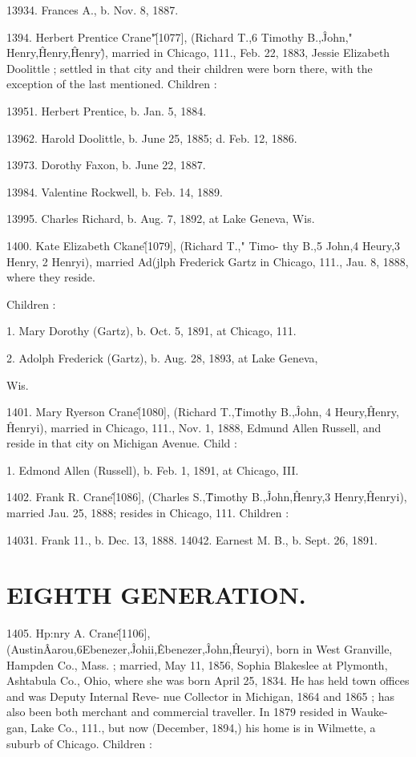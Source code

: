 \documentclass{book}
\begin{document}
13934. Frances A., b. Nov. 8, 1887. 

1394. Herbert Prentice Crane"\^ [1077], (Richard T.,6 
Timothy B.,\^ John," Henry,\^ Henry,\^ Henry\^), married in 
Chicago, 111., Feb. 22, 1883, Jessie Elizabeth Doolittle ; settled 
in that city and their children were born there, with the exception 
of the last mentioned. Children : 

13951. Herbert Prentice, b. Jan. 5, 1884. 

13962. Harold Doolittle, b. June 25, 1885; d. Feb. 12, 1886. 

13973. Dorothy Faxon, b. June 22, 1887. 

13984. Valentine Rockwell, b. Feb. 14, 1889. 

13995. Charles Richard, b. Aug. 7, 1892, at Lake Geneva, Wis. 




1400. Kate Elizabeth Ckane\^ [1079], (Richard T.," Timo- 
thy B.,5 John,4 Heury,3 Henry, 2 Henryi), married Ad(jlph 
Frederick Gartz in Chicago, 111., Jau. 8, 1888, where they reside. 

Children : 

1. Mary Dorothy (Gartz), b. Oct. 5, 1891, at Chicago, 111. 

2. Adolph Frederick (Gartz), b. Aug. 28, 1893, at Lake Geneva, 

Wis. 

1401. Mary Ryerson Crane\^ [1080], (Richard T.,\^ Timothy 
B.,\^ John, 4 Heury,\^ Henry, \^ Henryi), married in Chicago, 111., 
Nov. 1, 1888, Edmund Allen Russell, and reside in that city on 
Michigan Avenue. Child : 

1. Edmond Allen (Russell), b. Feb. 1, 1891, at Chicago, III. 

1402. Frank R. Crane\^ [1086], (Charles S.,\^ Timothy B.,\^ 
John,\^ Henry,3 Henry,\^ Henryi), married Jau. 25, 1888; resides 
in Chicago, 111. Children : 

14031. Frank 11., b. Dec. 13, 1888. 
14042. Earnest M. B., b. Sept. 26, 1891. 



\section{EIGHTH GENERATION.}


1405. Hp:nry A. Crane\^ [1106], (Austin\^ Aarou,6Ebenezer,\^ 
Johii,\^ Ebenezer,\^ John,\^ Heuryi), born in West Granville, 
Hampden Co., Mass. ; married, May 11, 1856, Sophia Blakeslee 
at Plymonth, Ashtabula Co., Ohio, where she was born April 25, 
1834. He has held town offices and was Deputy Internal Reve- 
nue Collector in Michigan, 1864 and 1865 ; has also been both 
merchant and commercial traveller. In 1879 resided in Wauke- 
gan, Lake Co., 111., but now (December, 1894,) his home is in 
Wilmette, a suburb of Chicago. Children : 
\end{document}
